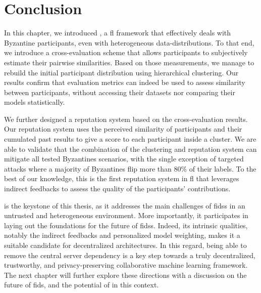 \section{Conclusion\label{sec:radar.conclu}}

In this chapter, we introduced \thecontrib, a \acrlong{fl} framework that effectively deals with Byzantine participants, even with heterogeneous data-distributions.
To that end, we introduce a cross-evaluation scheme that allows participants to subjectively estimate their pairwise similarities. 
Based on those measurements, we manage to rebuild the initial participant distribution using hierarchical clustering.
Our results confirm that evaluation metrics can indeed be used to assess similarity between participants, without accessing their datasets nor comparing their models statistically.

We further designed a reputation system based on the cross-evaluation results.
Our reputation system uses the perceived similarity of participants and their cumulated past results to give a score to each participant inside a cluster. 
We are able to validate that the combination of the clustering and reputation system can mitigate all tested Byzantines scenarios, with the single exception of targeted attacks where a majority of Byzantines flip more than 80\% of their labels. 
To the best of our knowledge, this is the first reputation system in \gls{fl} that leverages indirect feedbacks to assess the quality of the participants' contributions.

\thecontrib is the keystone of this thesis, as it addresses the main challenges of \glspl{fids} in an untrusted and heterogeneous environment.
More importantly, it participates in laying out the foundations for the future of \glspl{fids}.
Indeed, its intrinsic qualities, notably the indirect feedbacks and personalized model weighting, makes it a suitable candidate for decentralized architectures.
In this regard, being able to remove the central server dependency is a key step towards a truly decentralized, trustworthy, and privacy-preserving collaborative machine learning framework.
The next chapter will further explore these directions with a discussion on the future of \gls{fids}, and the potential of \thecontrib in this context.
